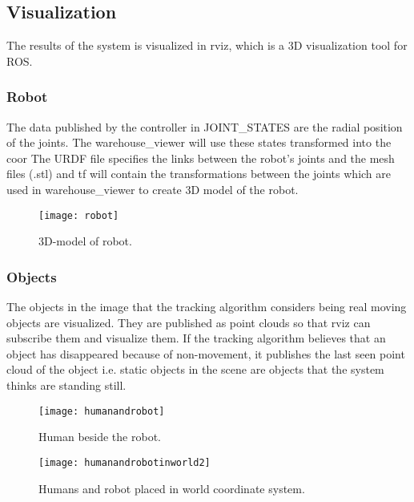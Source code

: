 \subsection{Visualization}

The results of the system is visualized in rviz, which is a 3D visualization tool for ROS. 

\subsubsection{Robot}
The data published by the controller in JOINT\_STATES are the radial position of the joints. The warehouse\_viewer will use these states transformed into the coor The URDF file specifies the links between the robot’s joints and the mesh files (.stl) and tf will contain the transformations between the joints which are used in warehouse\_viewer to create 3D model of the robot. 

\begin{figure}[H]
\begin{center}
\texttt{[image: robot]}
\caption{3D-model of robot.}

\end{center}
\end{figure}

\subsubsection{Objects}
The objects in the image that the tracking algorithm considers being real moving objects are visualized. They are published as point clouds so that rviz can subscribe them and visualize them. If the tracking algorithm believes that an object has disappeared because of non-movement, it publishes the last seen point cloud of the object i.e. static objects in the scene are objects that the system thinks are standing still. 

\begin{figure}[H]
\begin{center}
\texttt{[image: humanandrobot]}
\caption{Human beside the robot.}

\end{center}
\end{figure}

\begin{figure}[H]
\begin{center}
\texttt{[image: humanandrobotinworld2]}
\caption{Humans and robot placed in world coordinate system.}

\end{center}
\end{figure}  

